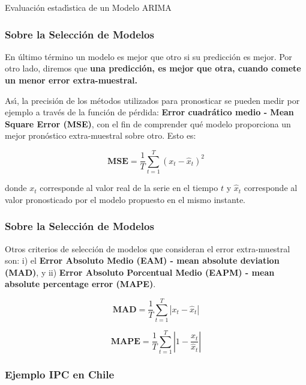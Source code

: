 \documentclass[spanish,xcolor=table]{beamer}
\begin{document}
\begin{section}{Evaluaci\'on estad\'{\i}stica de un Modelo ARIMA}
\begin{frame}
\frametitle{Sobre la Selecci\'on de Modelos}

En \'ultimo t\'ermino un modelo es mejor que otro si su predicci\'on es mejor. Por otro lado, diremos que \textbf{una predicci\'on, es mejor que otra, cuando comete un menor error extra-muestral.} 
\par
As\'{\i}, la precisi\'on de los m\'etodos utilizados para pronosticar se pueden medir por ejemplo a trav\'es de la funci\'on de p\'erdida: \textbf{Error cuadr\'atico medio - Mean Square Error (MSE)}, con el fin de comprender qu\'e modelo proporciona un mejor pron\'ostico extra-muestral sobre otro. Esto es:

\begin{equation}
\textbf{MSE}=\frac{1}{T} \sum_{t=1}^T (x_t-\hat{x}_t)^2
\label{MSE}
\end{equation}

donde $x_t$ corresponde al valor real de la serie en el tiempo $t$ y $\hat{x}_{t}$ corresponde al valor pronosticado por el modelo propuesto en el mismo instante.
 
\end{frame}

\begin{frame}
\frametitle{Sobre la Selecci\'on de Modelos}

Otros criterios de selecci\'on de modelos que consideran el error extra-muestral son: i) el \textbf{Error Absoluto Medio (EAM) - mean absolute deviation (MAD)}, y ii) \textbf{Error Absoluto Porcentual Medio (EAPM) - mean absolute percentage error (MAPE)}. 
 
 \begin{equation}
\textbf{MAD}=\frac{1}{T} \sum_{t=1}^T |x_t-\hat{x}_t|
\label{MAD}
\end{equation}

 \begin{equation}
\textbf{MAPE}=\frac{1}{T} \sum_{t=1}^T \left| 1 - \frac{x_t}{\hat{x}_t}\right|
\label{MAPE}
\end{equation}
\end{frame}

\begin{frame}
\frametitle{Ejemplo IPC en Chile}


\end{frame}
\end{section}
\end{document}
